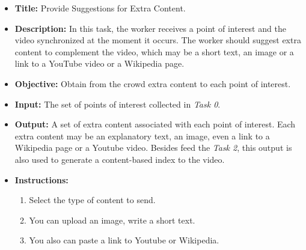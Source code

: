


\begin{itemize}

\item \textbf{Title:} Provide Suggestions for Extra Content.

\item \textbf{Description:} In this task, the worker receives a point of interest and the video synchronized at the moment it occurs. The worker should suggest extra content to complement the video, which may be a short text, an image or a link to a YouTube video or a Wikipedia page.

\item \textbf{Objective:} Obtain from the crowd extra content to each point of interest.


\item \textbf{Input:} The set of points of interest collected in \textit{Task 0}.


\item \textbf{Output:} A set of extra content associated with each point of interest. Each extra content may be an explanatory text, an image, even a link to a Wikipedia page or a Youtube video. Besides feed the \textit{Task 2}, this output is also used to generate a content-based index to the video.


\item \textbf{Instructions:} \begin{enumerate}
	\item Select the type of content to send.
	\item You can upload an image, write a short text.
	\item You also can paste a link to Youtube or Wikipedia.
\end{enumerate}


\end{itemize}
